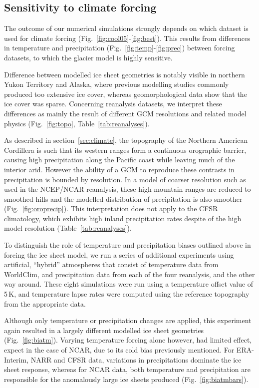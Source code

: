\subsection{Sensitivity to climate forcing}

The outcome of our numerical simulations strongly depends on which dataset is used for climate forcing (Fig.~\ref{fig:cool05}-\ref{fig:best}). This results from differences in temperature and precipitation (Fig.~\ref{fig:temp}-\ref{fig:prec}) between forcing datasets, to which the glacier model is highly sensitive.

Difference between modelled ice sheet geometries is notably visible in northern Yukon Territory and Alaska, where previous modelling studies commonly produced too extensive ice cover, whereas geomorphological data show that the ice cover was sparse. Concerning reanalysis datasets, we interpret these differences as mainly the result of different GCM resolutions and related model physics (Fig.~\ref{fig:topo}, Table~\ref{tab:reanalyses}).

As described in section~\ref{sec:climate}, the topography of the Northern American Cordillera is such that its western ranges form a continuous orographic barrier, causing high precipitation along the Pacific coast while leaving much of the interior arid. However the ability of a GCM to reproduce these contrasts in precipitation is bounded by resolution. In a model of coarser resolution such as used in the NCEP/NCAR reanalysis, these high mountain ranges are reduced to smoothed hills and the modelled distribution of precipitation is also smoother (Fig.~\ref{fig:oroprecip}). This interpretation does not apply to the CFSR climatology, which exhibits high inland precipitation rates despite of the high model resolution (Table~\ref{tab:reanalyses}).

To distinguish the role of temperature and precipitation biases outlined above in forcing the ice sheet model, we run a series of additional experiments using artificial, “hybrid” atmospheres that consist of temperature data from WorldClim, and precipitation data from each of the four reanalysis, and the other way around. These eight simulations were run using a temperature offset value of 5\,K, and temperature lapse rates were computed using the reference topography from the appropriate data.

Although only temperature or precipitation changes are applied, this experiment again resulted in a largely different modelled ice sheet geometries (Fig.~\ref{fig:biatm}). Varying temperature forcing alone however, had limited effect, expect in the case of NCAR, due to its cold bias previously mentioned. For ERA-Interim, NARR and CFSR data, variations in precipitations dominate the ice sheet response, whereas for NCAR data, both temperature and precipitation are responsible for the anomalously large ice sheets produced (Fig.~\ref{fig:biatmbars}). 

